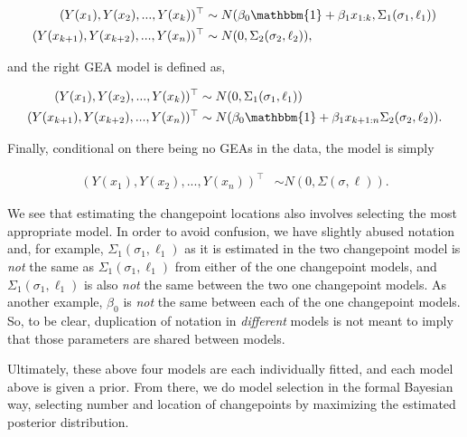 \documentclass[12pt]{article}
\begin{document}
\begin{align}
(Y(x_1), Y(x_2), ..., Y(x_{k}))^{\top} &\sim N(\beta_{0}\mathbbm{1} + \beta_{1} x_{1:k}, \Sigma_1(\sigma_1, \ell_1)) \\
(Y(x_{k + 1}), Y(x_{k + 2}), ..., Y(x_{n}))^{\top} &\sim N(0, \Sigma_2(\sigma_2, \ell_2)),
\end{align}

\noindent and the right GEA model is defined as,

\begin{align}
(Y(x_{1}), Y(x_{2}), ..., Y(x_{k}))^{\top} &\sim N(0, \Sigma_1(\sigma_1, \ell_1)) \\ 
(Y(x_{k + 1}), Y(x_{k + 2}), ..., Y(x_n))^{\top} &\sim N(\beta_{0}\mathbbm{1} + \beta_{1} x_{k + 1:n} \Sigma_2(\sigma_2, \ell_2)).
\end{align}

\noindent Finally, conditional on there being no GEAs in the data, the
model is simply

\begin{align}
(Y(x_{1}), Y(x_{2}), ..., Y(x_{n}))^{\top} &\sim N(0, \Sigma(\sigma, \ell)).
\end{align}

We see that estimating the changepoint locations also involves selecting
the most appropriate model. In order to avoid confusion, we have
slightly abused notation and, for example,
\(\Sigma_1(\sigma_1, \ell_1)\) as it is estimated in the two changepoint
model is \emph{not} the same as \(\Sigma_1(\sigma_1, \ell_1)\) from
either of the one changepoint models, and \(\Sigma_1(\sigma_1, \ell_1)\)
is also \emph{not} the same between the two one changepoint models. As
another example, \(\beta_0\) is \emph{not} the same between each of the
one changepoint models. So, to be clear, duplication of notation in
\emph{different} models is not meant to imply that those parameters are
shared between models.

Ultimately, these above four models are each individually fitted, and
each model above is given a prior. From there, we do model selection in
the formal Bayesian way, selecting number and location of changepoints
by maximizing the estimated posterior distribution.
\end{document}
